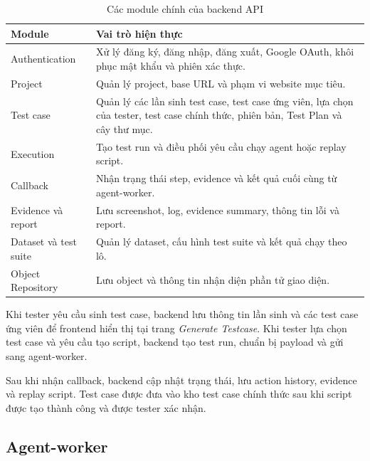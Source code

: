 \begin{table}[H]
\centering
\caption{Các module chính của backend API}
\label{tab:chapter5_backend_modules}
\renewcommand{\arraystretch}{1.2}
\begin{tabular}{|p{4.0cm}|p{10.2cm}|}
\hline
\textbf{Module} &
\textbf{Vai trò hiện thực} \\
\hline

Authentication &
Xử lý đăng ký, đăng nhập, đăng xuất, Google OAuth, khôi phục mật khẩu và phiên xác thực. \\
\hline

Project &
Quản lý project, base URL và phạm vi website mục tiêu. \\
\hline

Test case &
Quản lý các lần sinh test case, test case ứng viên, lựa chọn của tester, test case chính thức, phiên bản, Test Plan và cây thư mục. \\
\hline

Execution &
Tạo test run và điều phối yêu cầu chạy agent hoặc replay script. \\
\hline

Callback &
Nhận trạng thái step, evidence và kết quả cuối cùng từ agent-worker. \\
\hline

Evidence và report &
Lưu screenshot, log, evidence summary, thông tin lỗi và report. \\
\hline

Dataset và test suite &
Quản lý dataset, cấu hình test suite và kết quả chạy theo lô. \\
\hline

Object Repository &
Lưu object và thông tin nhận diện phần tử giao diện. \\
\hline
\end{tabular}
\end{table}

Khi tester yêu cầu sinh test case, backend lưu thông tin lần sinh và các test case ứng viên để frontend hiển thị tại trang \textit{Generate Testcase}. Khi tester lựa chọn test case và yêu cầu tạo script, backend tạo test run, chuẩn bị payload và gửi sang agent-worker.

Sau khi nhận callback, backend cập nhật trạng thái, lưu action history, evidence và replay script. Test case được đưa vào kho test case chính thức sau khi script được tạo thành công và được tester xác nhận.

\subsection{Agent-worker}

